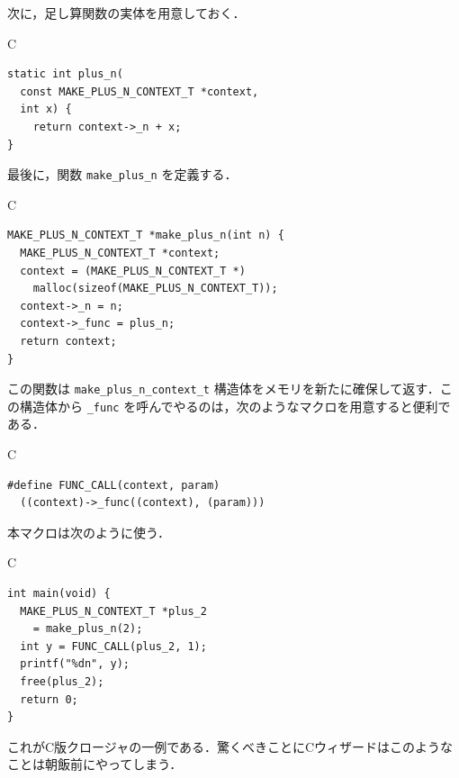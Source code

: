 \documentclass[a4paper,twocolumn]{jsbook}
\newcommand{\programminglanguage}[1]{\textsf{#1}}
\newcommand{\clang}{\programminglanguage{C}}
\newcommand{\code}[1]{\texttt{#1}}
\newenvironment{ccode}{\begin{itembox}[r]{\clang}}{\end{itembox}}
\begin{document}
次に，足し算関数の実体を用意しておく．
\begin{ccode}
\begin{verbatim}
static int plus_n(
  const MAKE_PLUS_N_CONTEXT_T *context,
  int x) {
    return context->_n + x;
}
\end{verbatim}
\end{ccode}

最後に，関数 \code{make\_plus\_n} を定義する．
\begin{ccode}
\begin{verbatim}
MAKE_PLUS_N_CONTEXT_T *make_plus_n(int n) {
  MAKE_PLUS_N_CONTEXT_T *context;
  context = (MAKE_PLUS_N_CONTEXT_T *)
    malloc(sizeof(MAKE_PLUS_N_CONTEXT_T));
  context->_n = n;
  context->_func = plus_n;
  return context;
}
\end{verbatim}
\end{ccode}
この関数は \code{make\_plus\_n\_context\_t} 構造体をメモリを新たに確保して返す．この構造体から \code{\_func} を呼んでやるのは，次のようなマクロを用意すると便利である．
\begin{ccode}
\begin{verbatim}
#define FUNC_CALL(context, param)
  ((context)->_func((context), (param)))
\end{verbatim}
\end{ccode}
本マクロは次のように使う．
\begin{ccode}
\begin{verbatim}
int main(void) {
  MAKE_PLUS_N_CONTEXT_T *plus_2
    = make_plus_n(2);
  int y = FUNC_CALL(plus_2, 1);
  printf("%dn", y);
  free(plus_2);
  return 0;
}
\end{verbatim}
\end{ccode}
これが\clang 版クロージャの一例である．驚くべきことに\clang ウィザードはこのようなことは朝飯前にやってしまう．

\end{document}
